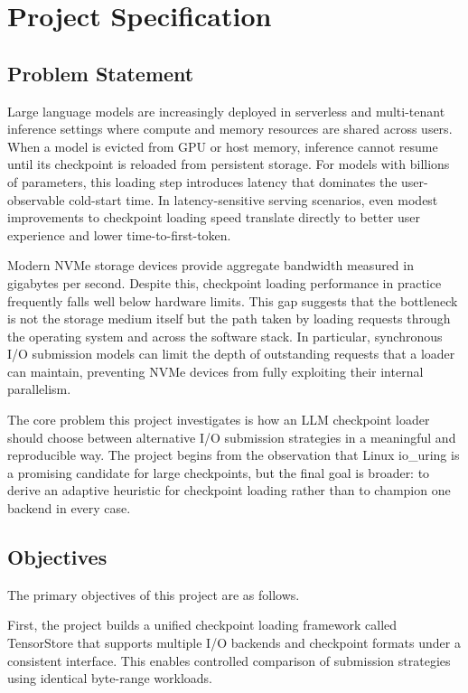 \chapter{Project Specification}
\label{chap:project_specification}

\section{Problem Statement}

Large language models are increasingly deployed in serverless and multi-tenant inference settings where compute and memory resources are shared across users. When a model is evicted from GPU or host memory, inference cannot resume until its checkpoint is reloaded from persistent storage. For models with billions of parameters, this loading step introduces latency that dominates the user-observable cold-start time. In latency-sensitive serving scenarios, even modest improvements to checkpoint loading speed translate directly to better user experience and lower time-to-first-token.

Modern NVMe storage devices provide aggregate bandwidth measured in gigabytes per second. Despite this, checkpoint loading performance in practice frequently falls well below hardware limits. This gap suggests that the bottleneck is not the storage medium itself but the path taken by loading requests through the operating system and across the software stack. In particular, synchronous I/O submission models can limit the depth of outstanding requests that a loader can maintain, preventing NVMe devices from fully exploiting their internal parallelism.

The core problem this project investigates is how an LLM checkpoint loader should choose between alternative I/O submission strategies in a meaningful and reproducible way. The project begins from the observation that Linux io\_uring is a promising candidate for large checkpoints, but the final goal is broader: to derive an adaptive heuristic for checkpoint loading rather than to champion one backend in every case.

\section{Objectives}

The primary objectives of this project are as follows.

First, the project builds a unified checkpoint loading framework called TensorStore that supports multiple I/O backends and checkpoint formats under a consistent interface. This enables controlled comparison of submission strategies using identical byte-range workloads.

